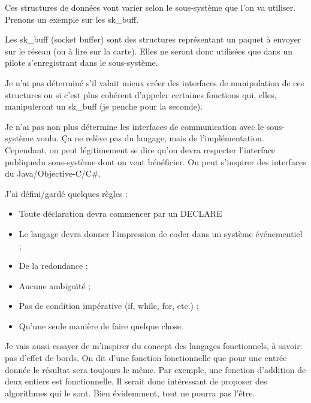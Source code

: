 \documentclass{rtxreport}
\begin{document}
Ces structures de données vont varier selon le sous-système que l’on va
utiliser. Prenons un exemple sur les sk\_buff.

Les sk\_buff (socket buffer) sont des structures représentant un paquet à
envoyer sur le réseau (ou à lire sur la carte). Elles ne seront donc utilisées
que dans un pilote s’enregistrant dans le sous-système.

Je n’ai pas déterminé s’il valait mieux créer des interfaces de manipulation de
ces structures ou si c’est plus cohérent d’appeler certaines fonctions qui,
elles, manipuleront un sk\_buff (je penche pour la seconde).

Je n’ai pas non plus détermine les interfaces de communication avec le
sous-système voulu. Ça ne relève pas du langage, mais de l’implémentation.
Cependant, on peut légitimement se dire qu’on devra respecter l’interface
publique\footnotemark[1] du sous-système dont on veut bénéficier. On peut
s’inspirer des interfaces du Java/Objective-C/C\#.



J’ai défini/gardé quelques règles : 
\begin{itemize}
	\item Toute déclaration devra commencer par un DECLARE 
	\item Le langage devra donner l’impression de coder dans un système
          événementiel ; 
	\item De la redondance ; 
	\item Aucune ambiguïté ;
	\item Pas de condition impérative (if, while, for, etc.) ; 
	\item Qu’une seule manière de faire quelque chose.
\end{itemize}

Je vais aussi essayer de m’inspirer du concept des langages
fonctionnels\footnotemark[2], à savoir: pas d’effet de bords. On dit d’une
fonction fonctionnelle que pour une entrée donnée le résultat sera toujours le
même. Par exemple, une fonction d’addition de deux entiers est fonctionnelle.
Il serait donc intéressant de proposer des algorithmes qui le sont. Bien
évidemment, tout ne pourra pas l’être.

\end{document}

